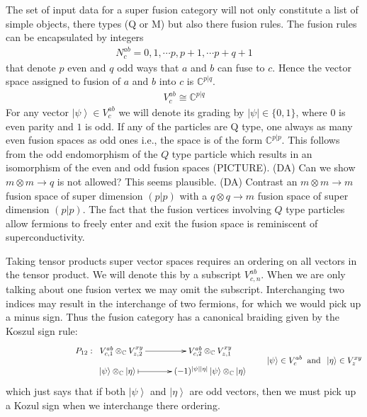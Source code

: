 \documentclass[12pt,a4paper]{article}
\newcommand{\tp}{\otimes}
\newcommand{\ket}[1]{\ensuremath{\left|#1\right\rangle}}
\newcommand{\dave}[1]{{\color{ao(english)}\footnotesize{(DA) #1}}}
\begin{document}
The set of input data for a super fusion category will not only constitute a list of simple objects, there types (Q or M) but also there fusion rules.
The fusion rules can be encapsulated by integers
\begin{align}
N_{c}^{ab}  = 0, 1, \cdots p, p+1, \cdots p+q+1
\end{align}
that denote $p$ even and $q$ odd ways that $a$ and $b$ can fuse to $c$.
Hence the vector space assigned to fusion of $a$ and $b$ into $c$ is $\mathbb{C}^{p|q}$.
\begin{align}
V^{ab}_c \cong \mathbb{C}^{p|q}
\end{align}
For any vector $\ket{\psi} \in V^{ab}_c$ we will denote its grading by $|\psi| \in \{ 0, 1\}$, where $0$ is even parity and $1$ is odd.
If any of the particles are Q type, one always as many even fusion spaces as odd ones i.e., the space is of the form $\mathbb{C}^{p|p}$.
This follows from the odd endomorphism of the $Q$ type particle which results in an isomorphism of the even and odd fusion spaces (PICTURE).
\dave{Can we show $m \tp m \rightarrow q$ is not allowed? This seems plausible.}
\dave{Contrast an $m \tp m \rightarrow m$ fusion space of super dimension $(p|p)$ with a $q \tp q \rightarrow m$ fusion space of super dimension $(p|p)$.}
The fact that the fusion vertices involving $Q$ type particles allow fermions to freely enter and exit the fusion space is reminiscent of superconductivity. 

Taking tensor products super vector spaces requires an ordering on all vectors in the tensor product.
We will denote this by a subscript $V^{ab}_{c,n}$.
When we are only talking about one fusion vertex we may omit the subscript.
Interchanging two indices may result in the interchange of two fermions, for which we would pick up a minus sign. 
Thus the fusion category has a canonical braiding given by the Koszul sign rule:
\begin{align}
\vcenter{\xymatrix @!0 @M=1mm @C=42mm{
 &P_{12}: \; \;V^{ab}_{c,1} \tp_{\mathbb{C}} V^{xy}_{z,2} \ar[r]            & V^{ab}_{c,2} \tp_{\mathbb{C}} V^{xy}_{z,1} \\
		  &\;\;\;\;\;\;\; \ket{\psi}\tp_\mathbb{C} \ket{\eta}  \ar@{|->}[r] & (-1)^{|\psi| |\eta|} \ket{\psi} \tp_{\mathbb{C}} \ket{\eta}
	}} \quad \quad \ket{\psi} \in V^{ab}_{c} \;\; \text{and} \;\;  \ket{\eta} \in V^{xy}_{z}
\end{align}
which just says that if both $\ket{\psi}$ and $\ket{\eta}$ are odd vectors, then we must pick up a Kozul sign when we interchange there ordering. 
\end{document}
